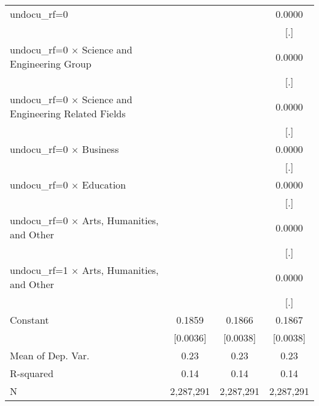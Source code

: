 \begin{table}[htbp]
\begin{tabular}{l*{3}{c}}
\addlinespace
undocu\_rf=0         &                     &                     &      0.0000         \\
                    &                     &                     &         [.]         \\
\addlinespace
undocu\_rf=0 $\times$ Science and Engineering Group&                     &                     &      0.0000         \\
                    &                     &                     &         [.]         \\
\addlinespace
undocu\_rf=0 $\times$ Science and Engineering Related Fields&                     &                     &      0.0000         \\
                    &                     &                     &         [.]         \\
\addlinespace
undocu\_rf=0 $\times$ Business&                     &                     &      0.0000         \\
                    &                     &                     &         [.]         \\
\addlinespace
undocu\_rf=0 $\times$ Education&                     &                     &      0.0000         \\
                    &                     &                     &         [.]         \\
\addlinespace
undocu\_rf=0 $\times$ Arts, Humanities, and Other&                     &                     &      0.0000         \\
                    &                     &                     &         [.]         \\
\addlinespace
undocu\_rf=1 $\times$ Arts, Humanities, and Other&                     &                     &      0.0000         \\
                    &                     &                     &         [.]         \\
\addlinespace
Constant            &      0.1859\sym{***}&      0.1866\sym{***}&      0.1867\sym{***}\\
                    &    [0.0036]         &    [0.0038]         &    [0.0038]         \\
\midrule
Mean of Dep. Var.   &        0.23         &        0.23         &        0.23         \\
R-squared           &        0.14         &        0.14         &        0.14         \\
N                   &   2,287,291         &   2,287,291         &   2,287,291         \\

\end{tabular}
\end{table}
